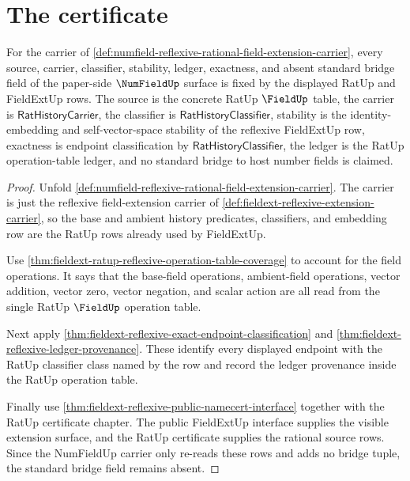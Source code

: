 \section{The certificate}
\label{sec:numfield-certificate}

\begin{theorem}
\label{thm:numfield-reflexive-rational-source-scope}
For the carrier of
\autoref{def:numfield-reflexive-rational-field-extension-carrier}, every
source, carrier, classifier, stability, ledger, exactness, and absent standard
bridge field of the paper-side $\NumFieldUp$ surface is fixed by the displayed
RatUp and FieldExtUp rows. The source is the concrete RatUp $\FieldUp$ table,
the carrier is $\mathsf{RatHistoryCarrier}$, the classifier is
$\mathsf{RatHistoryClassifier}$, stability is the identity-embedding and
self-vector-space stability of the reflexive FieldExtUp row, exactness is
endpoint classification by $\mathsf{RatHistoryClassifier}$, the ledger is the
RatUp operation-table ledger, and no standard bridge to host number fields is
claimed.
\end{theorem}
\begin{proof}
Unfold \autoref{def:numfield-reflexive-rational-field-extension-carrier}. The
carrier is just the reflexive field-extension carrier of
\autoref{def:fieldext-reflexive-extension-carrier}, so the base and ambient
history predicates, classifiers, and embedding row are the RatUp rows already
used by FieldExtUp.

Use
\autoref{thm:fieldext-ratup-reflexive-operation-table-coverage} to account for
the field operations. It says that the base-field operations, ambient-field
operations, vector addition, vector zero, vector negation, and scalar action
are all read from the single RatUp $\FieldUp$ operation table.

Next apply
\autoref{thm:fieldext-reflexive-exact-endpoint-classification} and
\autoref{thm:fieldext-reflexive-ledger-provenance}. These identify every
displayed endpoint with the RatUp classifier class named by the row and record
the ledger provenance inside the RatUp operation table.

Finally use
\autoref{thm:fieldext-reflexive-public-namecert-interface} together with the
RatUp certificate chapter. The public FieldExtUp interface supplies the
visible extension surface, and the RatUp certificate supplies the rational
source rows. Since the NumFieldUp carrier only re-reads these rows and adds no
bridge tuple, the standard bridge field remains absent.
\end{proof}

